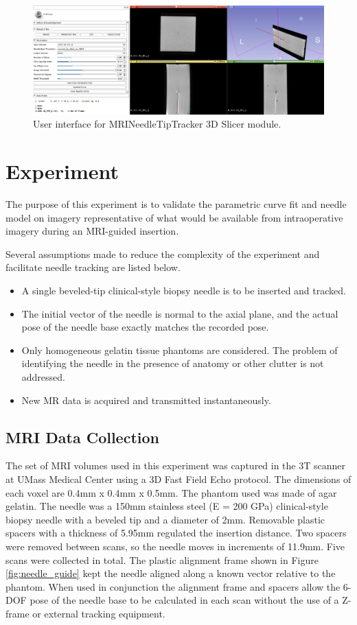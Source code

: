\begin{figure}[h]
\includegraphics[width=1.0\textwidth]{Fig/chap5/MRINeedleTipTracker_module.png}
\caption{User interface for MRINeedleTipTracker 3D Slicer module.}
\label{fig:slicer_gui}
\end{figure}

\section{Experiment}

The purpose of this experiment is to validate the parametric curve fit and needle model on imagery representative of what would be available from intraoperative imagery during an MRI-guided insertion.

Several assumptions made to reduce the complexity of the experiment and facilitate needle tracking are listed below.

\begin{itemize}
\item A single beveled-tip clinical-style biopsy needle is to be inserted and tracked.
\item The initial vector of the needle is normal to the axial plane, and the actual pose of the needle base exactly matches the recorded pose.
\item Only homogeneous gelatin tissue phantoms are considered. The problem of identifying the needle in the presence of anatomy or other clutter is not addressed.
\item New MR data is acquired and transmitted instantaneously.
\end{itemize}

\subsection{MRI Data Collection}
The set of MRI volumes used in this experiment was captured in the 3T scanner at UMass Medical Center using a 3D Fast Field Echo protocol. The dimensions of each voxel are 0.4mm x 0.4mm x 0.5mm. The phantom used was made of agar gelatin. The needle was a 150mm stainless steel (E = 200 GPa) clinical-style biopsy needle with a beveled tip and a diameter of 2mm. Removable plastic spacers with a thickness of 5.95mm regulated the insertion distance. Two spacers were removed between scans, so the needle moves in increments of 11.9mm. Five scans were collected in total. The plastic alignment frame shown in Figure \ref{fig:needle_guide} kept the needle aligned along a known vector relative to the phantom. When used in conjunction the alignment frame and spacers allow the 6-DOF pose of the needle base to be calculated in each scan without the use of a Z-frame or external tracking equipment.

